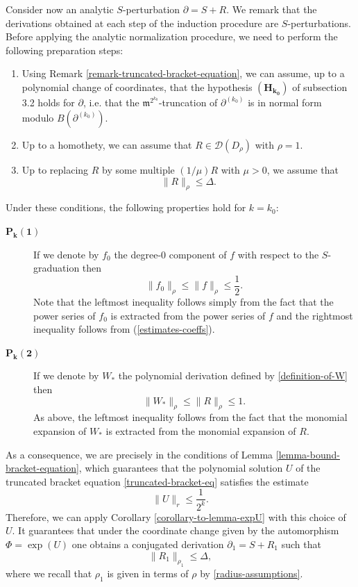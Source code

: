 \documentclass[10pt,twoside,reqno]{amsart}
\theoremstyle{remark}
\theoremstyle{remark}
\newcommand{\tmmathbf}[1]{{\boldsymbol{#1}}}
\newcommand{\cD}{\mathcal{D}}
\begin{document}
Consider now an analytic $S$-perturbation $\partial = S + R$. We remark that the derivations obtained at each step of the induction procedure are $S$-perturbations. Before applying
the analytic normalization procedure, we need to perform the following
preparation steps:
\begin{enumerate}
  \item Using Remark \ref{remark-truncated-bracket-equation}, we can
  assume, up to a polynomial change of coordinates, that the hypothesis
  $\mathbf{(H_{k_0})}$ of subsection 3.2 holds for $\partial$, i.e. that the
  $\mathfrak{m}^{2^{k_0}}$-truncation of $\partial^{(k_0)}$ is in normal form
  modulo $B (\partial^{(k_0)})$.
  
  \item Up to a homothety, we can assume that $R \in \cD (D_{\rho})$ with
  $\rho = 1$.
  
  \item Up to replacing $R$ by some multiple $(1 / \mu) R$ with $\mu > 0$, we
  assume that
  \[ \| R \|_{\rho} \leqslant \Delta. \]
\end{enumerate}
Under these conditions, the following properties
hold for $k=k_0$:
\begin{description}
  \item[$\tmmathbf{P_k (1)}$] If we denote by $f_0$ the degree-0 component of $f$ with
  respect to the $S$-graduation then
  \[ \| f_0 \|_{\rho} \leqslant \| f \|_{\rho} \leqslant \frac{1}{2}. \]
  Note that the leftmost inequality follows simply from the fact that the power series
  of $f_0$ is extracted from the power series of $f$ and the rightmost
  inequality follows from (\ref{estimates-coeffs}). 
  \item[$\tmmathbf{P_k (2)}$] If we denote by $W_{\ast}$ the polynomial derivation
  defined by \eqref{definition-of-W} then
  \[ \| W_{\ast} \|_{\rho} \leqslant \| R \|_{\rho} \leqslant 1. \]
  As above, the leftmost inequality follows from the fact that the monomial
  expansion of $W_{\ast}$ is extracted from the monomial expansion of $R$.
\end{description}
As a consequence, we are precisely in the conditions of Lemma
\ref{lemma-bound-bracket-equation}, which guarantees that the polynomial
solution $U$ of the truncated bracket equation \eqref{truncated-bracket-eq}
satisfies the estimate
\[ \| U \|_r \leqslant \frac{1}{2^k}. \]
Therefore, we can apply Corollary \ref{corollary-to-lemma-expU} with
this choice of $U$. It guarantees that under the coordinate change given by
the automorphism $\Phi = \exp (U)$ one obtains a conjugated derivation $\partial_1 = S + R_1$ such that
\[ \| R_1 \|_{\rho_1} \leqslant \Delta, \]
where we recall that $\rho_1$ is given in terms of $\rho$ by
\eqref{radius-assumptions}.
\end{document}
